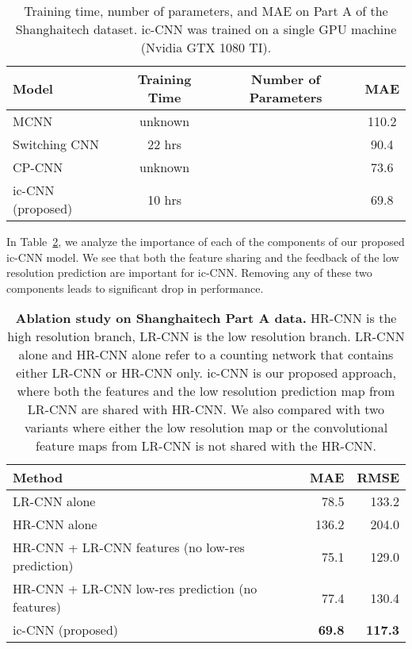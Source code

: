 \documentclass[runningheads]{llncs}
\begin{document}
\setlength{\tabcolsep}{10pt}
\begin{table}[!t]
\centering
\caption{Training time, number of parameters, and MAE on Part A of the Shanghaitech dataset. ic-CNN was trained on a single GPU  machine (Nvidia GTX 1080 TI). \label{tab:Rebuttal-trainingtime}}
\begin{tabular}{lccc}
\toprule
Model         & Training Time  &Number of Parameters & MAE \\
\midrule

MCNN ~\cite{zhang2016single}         &     unknown          &                 & 110.2    \\
Switching CNN~\cite{sam2017switching} &     22 hrs                 &          &  90.4   \\
CP-CNN ~\cite{sindagi2017generating}       & unknown         &                  & 73.6    \\
ic-CNN (proposed)  &     10 hrs                  &           & 69.8 \\
\bottomrule
\end{tabular}
\end{table}



In Table~\ref{tab:tableablation}, we analyze the importance of each of the components of our proposed ic-CNN model. We see that both the feature sharing  and the feedback of the low resolution prediction are important for ic-CNN. Removing any of these two components leads to significant drop in performance.

\begin{table}[!t]
\centering
\caption{{\bf Ablation study on Shanghaitech Part A data.} HR-CNN is the high resolution branch, LR-CNN is the low resolution branch. LR-CNN alone and HR-CNN alone  refer to a counting network that contains either LR-CNN or HR-CNN only. ic-CNN is our proposed approach, where both the features and the low resolution prediction map from LR-CNN are shared with HR-CNN. We also compared with two variants where either the low resolution map or the convolutional feature maps from LR-CNN is not shared with the HR-CNN. \label{tab:tableablation}}
\begin{tabular}{lrr}
\toprule
Method     & MAE   & RMSE   \\
\midrule
LR-CNN alone   & 78.5 & 133.2\\
HR-CNN alone  & 136.2  & 204.0 \\
HR-CNN + LR-CNN features (no low-res prediction) & 75.1  & 129.0\\
HR-CNN + LR-CNN low-res prediction (no features) & 77.4 & 130.4 \\
ic-CNN (proposed)  & \textbf{69.8} &  \textbf{117.3}\\
\bottomrule
\end{tabular}
\end{table}
\end{document}
